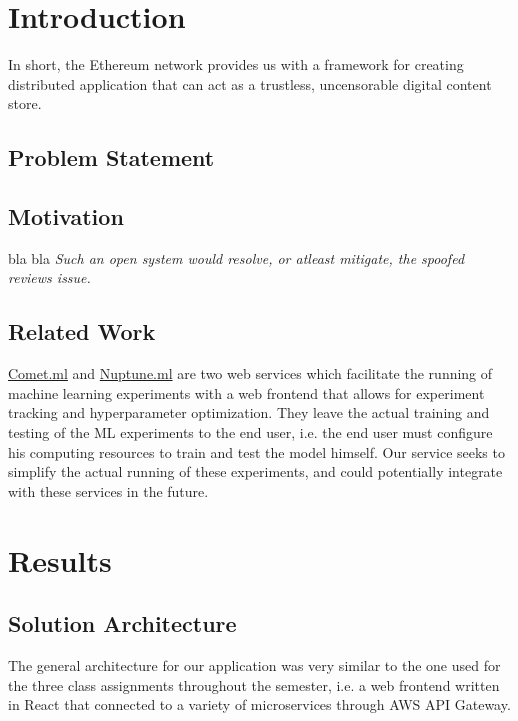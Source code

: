 \documentclass[12pt,oneside]{amsart}
\makeatletter
\newcommand*\ie{i.e.\@\xspace}
\makeatother
\begin{document}
\maketitle
\setlength{\columnsep}{20pt}
\begin{multicols}{2}

\section{Introduction}\label{sec:introduction}
In short, the Ethereum network provides us with a framework for creating distributed application that can act as a trustless, uncensorable digital content store.

\subsection{Problem Statement} \label{ch:problem_statement}
\subsection{Motivation} \label{ch:motivation}
bla bla \textit{Such an open system would resolve, or atleast mitigate, the spoofed reviews issue.}

\subsection{Related Work} \label{ch:previous}
\href{https://comet.ml/}{Comet.ml} and \href{https://neptune.ml/}{Nuptune.ml} are two web services which facilitate the running of machine learning experiments with a web frontend that allows for experiment tracking and hyperparameter optimization.
They leave the actual training and testing of the ML experiments to the end user, \ie the end user must configure his computing resources to train and test the model himself.
Our service seeks to simplify the actual running of these experiments, and could potentially integrate with these services in the future.

\section{Results} \label{ch:results}
\subsection{Solution Architecture}
The general architecture for our application was very similar to the one used for the three class assignments throughout the semester,
\ie a web frontend written in React that connected to a variety of microservices through AWS API Gateway.


\end{multicols}
\end{document}

